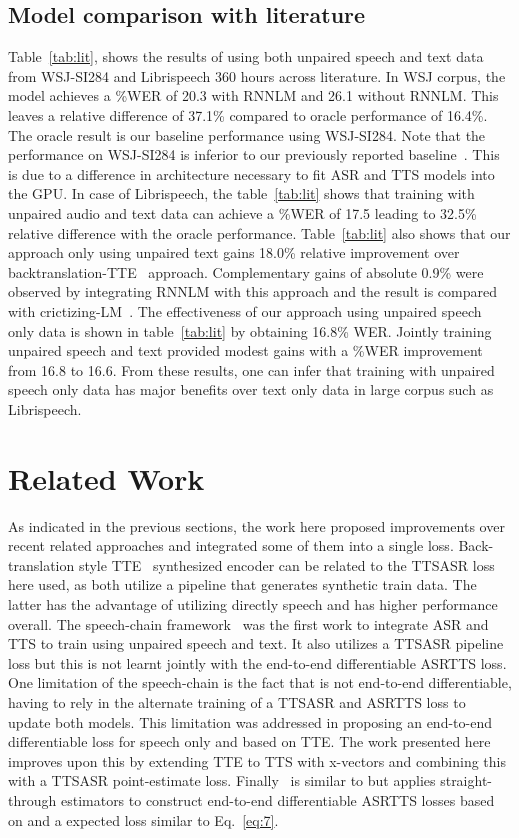 \documentclass[a4paper]{article}
\begin{document}
\subsection{Model comparison with literature}
Table~\ref{tab:lit}, shows the results of using both unpaired speech and text data from WSJ-SI284 and Librispeech 360 hours across literature. In WSJ corpus, the model achieves a \%WER of 20.3 with RNNLM and 26.1 without RNNLM. This leaves a relative difference of 37.1\% compared to oracle performance of 16.4\%. The oracle result is our baseline performance using WSJ-SI284. Note that the performance on WSJ-SI284 is inferior to our previously reported baseline~\cite{baskar2018promising}. This is due to a difference in architecture necessary to fit ASR and TTS models into the GPU.
In case of Librispeech, the table~\ref{tab:lit} shows that training with unpaired audio and text data can achieve a \%WER of 17.5 leading to 32.5\% relative difference with the oracle performance. Table~\ref{tab:lit} also shows that our approach only using unpaired text gains 18.0\% relative improvement over backtranslation-TTE~\cite{hayashi2018back} approach. Complementary gains of absolute 0.9\% were observed by integrating RNNLM with this approach and the result is compared with crictizing-LM~\cite{liuLM}. The effectiveness of our approach using unpaired speech only data is shown in table~\ref{tab:lit} by obtaining 16.8\% WER. Jointly training unpaired speech and text provided modest gains with a \%WER improvement from 16.8 to 16.6. From these results, one can infer that training with unpaired speech only data has major benefits over text only data in large corpus such as Librispeech.

\section{Related Work}
As indicated in the previous sections, the work here proposed improvements over recent related approaches and integrated some of them into a single loss. Back-translation style TTE~\cite{hayashi2018back} synthesized encoder can be related to the TTSASR loss here used, as both utilize a pipeline that generates synthetic train data. The latter has the advantage of utilizing directly speech and has higher performance overall. The speech-chain framework~\cite{tjandra2017listening} was the first work to integrate ASR and TTS to train using unpaired speech and text. It also utilizes a TTSASR pipeline loss but this is not learnt jointly with the end-to-end differentiable ASRTTS loss. One limitation of the speech-chain is the fact that is not end-to-end differentiable, having to rely in the alternate training of a TTSASR and ASRTTS loss to update both models. This limitation was addressed in \cite{hori2018cycle} proposing an end-to-end differentiable loss for speech only and based on TTE. The work presented here improves upon this by extending TTE to TTS with x-vectors and combining this with a TTSASR point-estimate loss. Finally~\cite{tjandra2018end} is similar to \cite{hori2018cycle} but applies straight-through estimators to construct end-to-end differentiable ASRTTS losses based on  and a expected loss similar to Eq.~\ref{eq:7}.
\end{document}
